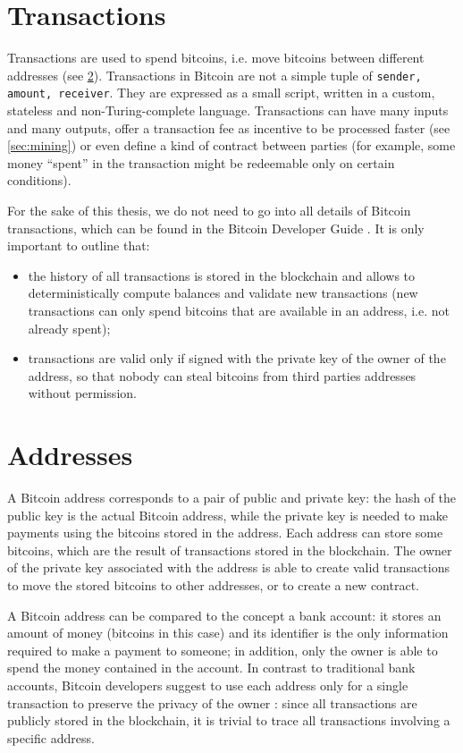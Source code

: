 \section{Transactions}
Transactions are used to spend bitcoins, i.e. move bitcoins between different addresses (see \cref{sec:addresses}).
Transactions in Bitcoin are not a simple tuple of \texttt{\textlangle sender, amount, receiver\textrangle}.
They are expressed as a small script, written in a custom, stateless and non-Turing-complete language.
Transactions can have many inputs and many outputs, offer a transaction fee as incentive to be processed faster (see \cref{sec:mining}) or even define a kind of contract between parties (for example, some money ``spent'' in the transaction might be redeemable only on certain conditions).

For the sake of this thesis, we do not need to go into all details of Bitcoin transactions, which can be found in the Bitcoin Developer Guide \cite{bitcoin_guide}.
It is only important to outline that:
\begin{itemize}
	\item the history of all transactions is stored in the blockchain and allows to deterministically compute balances and validate new transactions (new transactions can only spend bitcoins that are available in an address, i.e. not already spent);
	\item transactions are valid only if signed with the private key of the owner of the address, so that nobody can steal bitcoins from third parties addresses without permission.
\end{itemize}

\section{Addresses}
\label{sec:addresses}
A Bitcoin address corresponds to a pair of public and private key: the hash of the public key is the actual Bitcoin address, while the private key is needed to make payments using the bitcoins stored in the address.
Each address can store some bitcoins, which are the result of transactions stored in the blockchain.
The owner of the private key associated with the address is able to create valid transactions to move the stored bitcoins to other addresses, or to create a new contract.

A Bitcoin address can be compared to the concept a bank account:
it stores an amount of money (bitcoins in this case) and its identifier is the only information required to make a payment to someone;
in addition, only the owner is able to spend the money contained in the account.
In contrast to traditional bank accounts, Bitcoin developers suggest to use each address only for a single transaction to preserve the privacy of the owner \cite{bitcoin_guide}:
since all transactions are publicly stored in the blockchain, it is trivial to trace all transactions involving a specific address.

